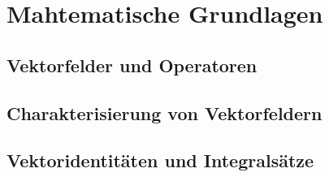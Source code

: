 %
%
%
%
\section{Mahtematische Grundlagen
\label{helmholtz:section:Mahtematische_Grundlagen}}


\subsection{Vektorfelder und Operatoren
\label{helmholtz:subsection:Vektorfelder_Operatoren}}

\subsection{Charakterisierung von Vektorfeldern
\label{helmholtz:subsection:Charakterisierung}}

\subsection{Vektoridentitäten und Integralsätze
\label{helmholtz:subsection:Vektoridentitaeten}}


